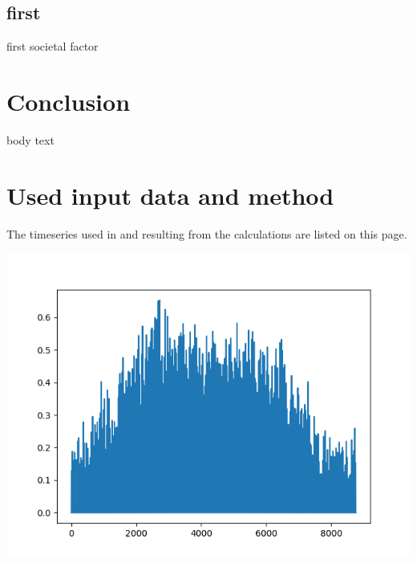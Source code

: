 \documentclass{article}
\begin{document}
\begin{multicols*}{2}
\subsection{first}

first societal factor

\section*{Conclusion}

body text

\newpage 

\appendix

\section*{Used input data and method}

The timeseries used in and resulting from the calculations are listed on this page.

\begin{center}

\includegraphics[width=\linewidth]{per_unit_pv_generation.png}

\end{center}






\begin{center}


\end{center}
\end{multicols*}
\end{document}
